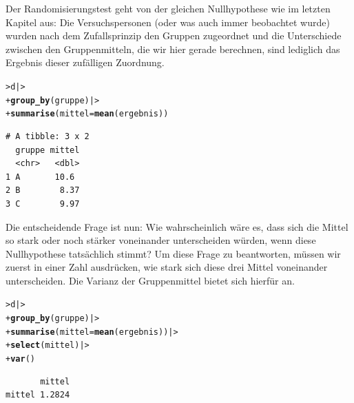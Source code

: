 \documentclass[oneside, 10pt]{book}\usepackage[]{graphicx}\usepackage[]{xcolor}
\makeatletter
\newcommand{\hlstd}[1]{\textcolor[rgb]{0.345,0.345,0.345}{#1}}%
\newcommand{\hlkwc}[1]{\textcolor[rgb]{0.333,0.667,0.333}{#1}}%
\newcommand{\hlkwd}[1]{\textcolor[rgb]{0.737,0.353,0.396}{\textbf{#1}}}%
\newenvironment{kframe}{%
 \def\at@end@of@kframe{}%
 \ifinner\ifhmode%
  \def\at@end@of@kframe{\end{minipage}}%
  \begin{minipage}{\columnwidth}%
 \fi\fi%
 \def\FrameCommand##1{\hskip\@totalleftmargin \hskip-\fboxsep
 \colorbox{shadecolor}{##1}\hskip-\fboxsep
     \hskip-\linewidth \hskip-\@totalleftmargin \hskip\columnwidth}%
 \MakeFramed {\advance\hsize-\width
   \@totalleftmargin\z@ \linewidth\hsize
   \@setminipage}}%
 {\par\unskip\endMakeFramed%
 \at@end@of@kframe}
\newenvironment{knitrout}{}{} %
\makeatother
\begin{document}
Der Randomisierungstest geht von der gleichen Nullhypothese wie im letzten Kapitel aus:
Die Versuchspersonen (oder was auch immer beobachtet wurde) wurden nach dem Zufallsprinzip
den Gruppen zugeordnet und die Unterschiede zwischen den Gruppenmitteln, die wir hier
gerade berechnen, sind lediglich
das Ergebnis dieser zufälligen Zuordnung.
\begin{knitrout}
\color{fgcolor}\begin{kframe}
\begin{alltt}
\hlstd{> }\hlstd{d |>}
\hlstd{+ }  \hlkwd{group_by}\hlstd{(gruppe) |>}
\hlstd{+ }  \hlkwd{summarise}\hlstd{(}\hlkwc{mittel} \hlstd{=} \hlkwd{mean}\hlstd{(ergebnis))}
\end{alltt}
\begin{verbatim}
# A tibble: 3 x 2
  gruppe mittel
  <chr>   <dbl>
1 A       10.6 
2 B        8.37
3 C        9.97
\end{verbatim}
\end{kframe}
\end{knitrout}

Die entscheidende Frage ist nun:
Wie wahrscheinlich wäre es, dass sich die Mittel so stark
oder noch stärker voneinander unterscheiden würden, wenn diese Nullhypothese tatsächlich stimmt?
Um diese Frage zu beantworten, müssen wir zuerst in einer Zahl ausdrücken, wie stark
sich diese drei Mittel voneinander unterscheiden.
Die Varianz der Gruppenmittel bietet sich hierfür an.
\begin{knitrout}
\color{fgcolor}\begin{kframe}
\begin{alltt}
\hlstd{> }\hlstd{d |>}
\hlstd{+ }  \hlkwd{group_by}\hlstd{(gruppe) |>}
\hlstd{+ }  \hlkwd{summarise}\hlstd{(}\hlkwc{mittel} \hlstd{=} \hlkwd{mean}\hlstd{(ergebnis)) |>}
\hlstd{+ }  \hlkwd{select}\hlstd{(mittel) |>}
\hlstd{+ }  \hlkwd{var}\hlstd{()}
\end{alltt}
\begin{verbatim}
       mittel
mittel 1.2824
\end{verbatim}
\end{kframe}
\end{knitrout}
\end{document}
